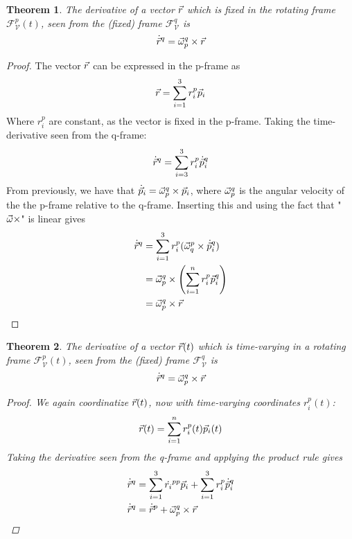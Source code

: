 \documentclass{article}
\newtheorem{theorem}{Theorem}
\begin{document}
\begin{theorem}
    The derivative of a vector $\vec{r}$ which is fixed in the rotating frame $\mathcal{F}_{\mathcal{V}}^p(t)$, seen from the (fixed) frame $\mathcal{F}_{\mathcal{V}}^q$ is
    $$\dot{\vec{r}}^q = \vec{\omega}_p^q\times\vec{r}$$
\end{theorem}
\begin{proof}
    The vector $\vec{r}$ can be expressed in the p-frame as
    $$\vec{r} = \sum_{i=1}^3r_i^p\vec{p}_i$$
    Where $r_i^p$ are constant, as the vector is fixed in the p-frame. Taking the time-derivative seen from the q-frame:
    $$\dot{\vec{r}}^q = \sum_{i=3}^3r_i^p\dot{\vec{p}}_i^q$$
    From previously, we have that $\dot{\vec{p}}_i = \vec{\omega}_p^{q} \times \vec{p}_i$, where $\vec{\omega}_p^q$ is the angular velocity of the the p-frame relative to the q-frame. Inserting this and using the fact that "$\vec{\omega} \times$" is linear gives
    \begin{align*}
        \dot{\vec{r}}^q &= \sum_{i=1}^3r_i^p(\vec{\omega}_q^p\times\dot{\vec{p}}_i^q) \\
        &=\vec{\omega}_p^q \times\left( \sum_{i=1}^nr_i^p\vec{p}_i^q \right)\\
        &= \vec{\omega}_p^q \times \vec{r}
    \end{align*}
\end{proof}

\begin{theorem}
    The derivative of a vector $\vec{r}(t)$ which is time-varying in a rotating frame $\mathcal{F}_{\mathcal{V}}^p(t)$, seen from the (fixed) frame $\mathcal{F}_{\mathcal{V}}^q$ is
    $$\dot{\vec{r}}^q = \vec{\omega}_p^q\times\vec{r}$$
    \begin{proof}
        We again coordinatize $\vec{r}(t)$, now with time-varying coordinates $r_i^p(t)$:
        $$\vec{r}(t) = \sum_{i=1}^nr_i^p(t)\vec{p}_i(t)$$
        Taking the derivative seen from the q-frame and applying the product rule gives
        \begin{align*}
            \dot{\vec{r}}^q &= \sum_{i=1}^{3}{\dot{r_i}^{pp}}\vec{p}_i + \sum_{i=1}^{3}r_i^p\dot{\vec{p}}_i^q \\
            \dot{\vec{r}}^q &= \dot{\vec{r}}^p + \vec{\omega}_p^q\times\vec{r}
        \end{align*}

    \end{proof}
\end{theorem}
\end{document}
